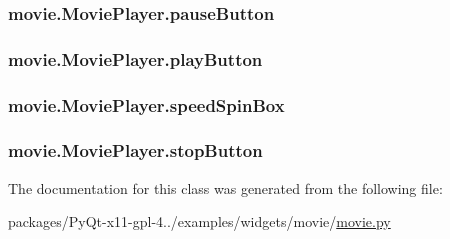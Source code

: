 \subsubsection[{pause\+Button}]{\setlength{\rightskip}{0pt plus 5cm}movie.\+Movie\+Player.\+pause\+Button}\label{classmovie_1_1MoviePlayer_a8838bb9531482002a7471844bb90fe2d}
\hypertarget{classmovie_1_1MoviePlayer_a198221c04b3c774782cf63b734333cc6}{}
\subsubsection[{play\+Button}]{\setlength{\rightskip}{0pt plus 5cm}movie.\+Movie\+Player.\+play\+Button}\label{classmovie_1_1MoviePlayer_a198221c04b3c774782cf63b734333cc6}
\hypertarget{classmovie_1_1MoviePlayer_a07393d519e0565759e4704a5e16c40c6}{}
\subsubsection[{speed\+Spin\+Box}]{\setlength{\rightskip}{0pt plus 5cm}movie.\+Movie\+Player.\+speed\+Spin\+Box}\label{classmovie_1_1MoviePlayer_a07393d519e0565759e4704a5e16c40c6}
\hypertarget{classmovie_1_1MoviePlayer_a9eeb8ad1adbec24582db8cffb4d00c51}{}
\subsubsection[{stop\+Button}]{\setlength{\rightskip}{0pt plus 5cm}movie.\+Movie\+Player.\+stop\+Button}\label{classmovie_1_1MoviePlayer_a9eeb8ad1adbec24582db8cffb4d00c51}


The documentation for this class was generated from the following file\+:\begin{DoxyCompactItemize}
\item 
packages/\+Py\+Qt-\/x11-\/gpl-\/4../examples/widgets/movie/\hyperlink{movie_8py}{movie.\+py}\end{DoxyCompactItemize}
